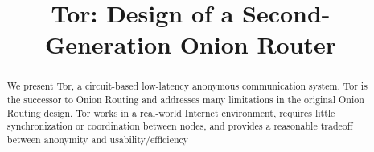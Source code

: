 \documentclass[times,10pt,twocolumn]{article}
\begin{document}

\title{Tor: Design of a Second-Generation Onion Router}


\maketitle
\thispagestyle{empty}

\begin{abstract}
We present Tor, a circuit-based low-latency anonymous communication
system. Tor is the successor to Onion Routing
and addresses many limitations in the original Onion Routing design.
Tor works in a real-world Internet environment,
requires little synchronization or coordination between nodes, and
provides a reasonable tradeoff between anonymity and usability/efficiency
\end{abstract}



\label{sec:intro}
\end{document}
